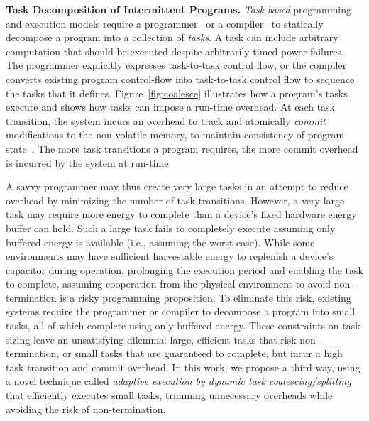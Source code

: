 \textbf{Task Decomposition of Intermittent Programs.} {\em
Task-based} programming and execution models require a
programmer~\citep{alpaca,chain} or a compiler~\cite{baghsorkhi_cgo_2018} to
statically decompose a program into a collection of {\em tasks}.  A task can
include arbitrary computation that should be executed despite arbitrarily-timed power failures.
%
The programmer explicitly expresses task-to-task control flow, or the compiler
converts existing program control-flow into task-to-task control flow to sequence 
the tasks that it defines.
%
Figure~\ref{fig:coalesce} illustrates how a program's tasks execute and
shows how tasks can impose a run-time overhead. At each task transition, the system incurs an overhead to track and atomically \emph{commit} modifications to the non-volatile memory, to maintain consistency of program state~\citep{chain,alpaca}. The more task transitions a program requires, the more commit overhead is incurred by the system at run-time.

A savvy programmer may thus create very large tasks in an attempt to reduce
overhead by minimizing the number of task transitions. However, a very large
task may require more energy to complete than a device's fixed hardware energy
buffer can hold. Such a large task fails to completely execute assuming only
buffered energy is available (i.e., assuming the worst case). While some
environments may have sufficient harvestable energy to replenish a device's
capacitor during operation, prolonging the execution period and enabling the
task to complete, assuming cooperation from the physical environment to avoid
non-termination is a risky programming proposition. To eliminate this risk,
existing systems require the programmer or compiler to decompose a program
into small tasks, all of which complete using only buffered energy. These
constraints on task sizing leave an unsatisfying dilemma: large, efficient
tasks that risk non-termination, or small tasks that are guaranteed to
complete, but incur a high task transition and commit overhead. In this work,
we propose a third way, using a novel technique called {\em adaptive execution by dynamic task
coalescing/splitting} that efficiently executes small tasks, trimming unnecessary overheads while avoiding the risk of non-termination.

